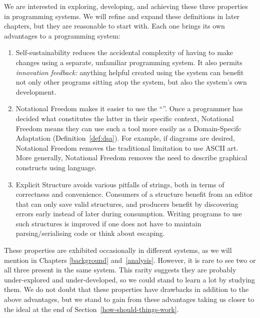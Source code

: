 We are interested in exploring, developing, and achieving these three
properties in programming systems. We will refine and expand these
definitions in later chapters, but they are reasonable to start with.
Each one brings its own advantages to a programming system:

\begin{enumerate}
\def\labelenumi{\arabic{enumi}.}
\tightlist
\item
  Self-sustainability reduces the accidental complexity of having to
  make changes using a separate, unfamiliar programming system. It also
  permits \emph{innovation feedback:} anything helpful created using the
  system can benefit not only other programs sitting atop the system,
  but also the system's own development.
\item
  Notational Freedom makes it easier to use the ``\RTFJ''. Once a
  programmer has decided what constitutes the latter in their specific
  context, Notational Freedom means they can use such a tool more easily
  as a Domain-Specifc Adaptation (Definition~\ref{def:dsa}). For
  example, if diagrams are desired, Notational Freedom removes the
  traditional limitation to use ASCII art. More generally, Notational
  Freedom removes the need to describe graphical constructs using
  language.
\item
  Explicit Structure avoids various pitfalls of strings, both in terms
  of correctness and convenience. Consumers of a structure benefit from
  an editor that can only save valid structures, and producers benefit
  by discovering errors early instead of later during consumption.
  Writing programs to use such structures is improved if one does not
  have to maintain parsing/serialising code or think about escaping.
\end{enumerate}

These properties are exhibited occasionally in different systems, as we
will mention in Chapters \ref{background} and~\ref{analysis}. However,
it is rare to see two or all three present in the same system. This
rarity suggests they are probably under-explored and under-developed, so
we could stand to learn a lot by studying them. We do not doubt that
these properties have drawbacks in addition to the above advantages, but
we stand to gain from these advantages taking us closer to the ideal at
the end of Section~\ref{how-should-things-work}.

